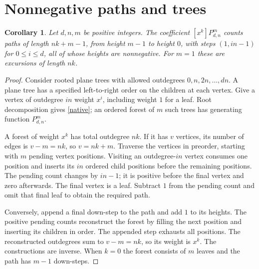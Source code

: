 \documentclass[11pt]{article}
\newtheorem{corollary}[theorem]{Corollary}
\newcommand{\coef}[2]{[#1^{#2}]}
\begin{document}
\section{Nonnegative paths and trees}
\begin{corollary}\label{paths}
Let $d,n,m$ be positive integers. The coefficient $\coef{x}{k}P_{d,n}^m$ counts paths
of length $nk+m-1$, from height $m-1$ to height $0$, with steps
$(1,in-1)$ for $0\leq i\leq d$, all of whose heights are nonnegative.
For $m=1$ these are excursions of length $nk$.
\end{corollary}
\begin{proof}
Consider rooted plane trees with allowed outdegrees $0,n,2n,\ldots,dn$.
A plane tree has a specified left-to-right order on the children at each
vertex. Give a vertex of outdegree $in$ weight $x^i$, including weight $1$
for a leaf. Root decomposition gives \eqref{native}; an ordered forest
of $m$ such trees has generating function $P_{d,n}^m$.

A forest of weight $x^k$ has total outdegree $nk$. If it has $v$ vertices,
its number of edges is $v-m=nk$, so $v=nk+m$.
Traverse the vertices in preorder, starting with $m$ pending vertex
positions. Visiting an outdegree-$in$ vertex consumes one position and
inserts its $in$ ordered child positions before the remaining positions.
The pending count changes by $in-1$; it is positive before the final
vertex and zero afterwards. The final vertex is a leaf.
Subtract $1$ from the pending count and omit that final leaf to obtain
the required path.

Conversely, append a final down-step to the path and add $1$ to its
heights. The positive pending counts reconstruct the forest by filling
the next position and inserting its children in order. The appended
step exhausts all positions. The reconstructed outdegrees sum to
$v-m=nk$, so its weight is $x^k$. The constructions are inverse.
When $k=0$ the forest consists of $m$ leaves and the path has $m-1$
down-steps.
\end{proof}
\end{document}
